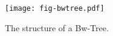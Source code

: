 \begin{figure}[t]
\texttt{[image: fig-bwtree.pdf]}
\caption{ The structure of a Bw-Tree.}
\label{fig:bw-tree}
\end{figure}
